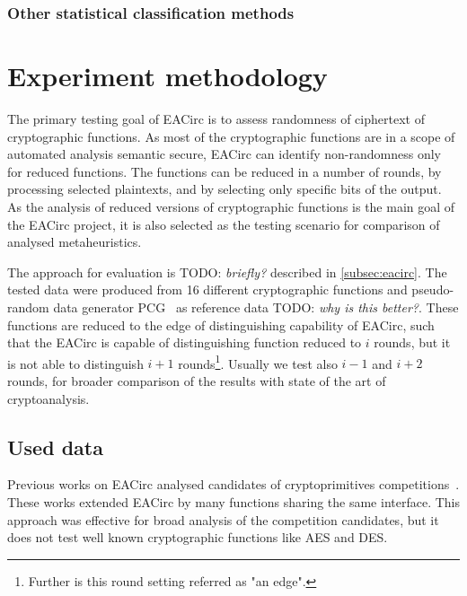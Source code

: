 \documentclass[
  print, %
  Table,   %
  nolof,     %
  nolot,     %
  11pt, %
  oneside  %
]{fithesis3}
\newcommand{\todo}[1]{TODO: \textit{#1}}
\begin{document}
\subsection{Other statistical classification methods}




\chapter{Experiment methodology}
\label{chap:method}

The primary testing goal of EACirc is to assess randomness of ciphertext of cryptographic functions. As most of the cryptographic functions are in a scope of automated analysis semantic secure, EACirc can identify non-randomness only for reduced functions. The functions can be reduced in a number of rounds, by processing selected plaintexts, and by selecting only specific bits of the output. As the analysis of reduced versions of cryptographic functions is the main goal of the EACirc project, it is also selected as the testing scenario for comparison of analysed metaheuristics.

The approach for evaluation is \todo{briefly?} described in \cref{subsec:eacirc}. The tested data were produced from 16 different cryptographic functions and pseudo-random data generator PCG~\cite{pcgGen} as reference data \todo{why is this better?}. These functions are reduced to the edge of distinguishing capability of EACirc, such that the EACirc is capable of distinguishing function reduced to $i$ rounds, but it is not able to distinguish $i+1$ rounds\footnote{Further is this round setting referred as "an edge".}. Usually we test also $i-1$ and $i+2$ rounds, for broader comparison of the results with state of the art of cryptoanalysis.

\section{Used data}
\label{sec:method-data}

Previous works on EACirc analysed candidates of cryptoprimitives competitions~\cite{estreamMgrThesis,sha3Thesis,ukropMgrThesis}. These works extended EACirc by many functions sharing the same interface. This approach was effective for broad analysis of the competition candidates, but it does not test well known cryptographic functions like AES and DES.
\end{document}
